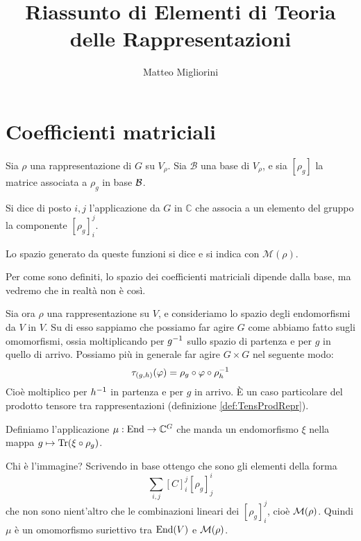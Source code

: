 \documentclass[a4paper,10pt,oneside]{math_article}
\title{Riassunto di Elementi di Teoria delle Rappresentazioni}
\author{Matteo Migliorini}
\date{}
\renewcommand{\phi}{\varphi}
\newcommand{\func}[2][\bC]{#1^{#2}}
\begin{document}
 
 
 \maketitle
 
 \cleardoublepage	
 
 \cleardoublepage
 \tableofcontents
 \cleardoublepage
 
 
 
 
 
 
 

  \section{Coefficienti matriciali}
    \begin{mydef}
     Sia $\rho$ una rappresentazione di $G$ su $V_\rho$. Sia $\mathcal B$ una base di $V_\rho$, e sia $[\rho_g]$ la matrice associata a $\rho_g$ in base $\mathcal B$.
     
     Si dice  di posto $i,j$ l'applicazione da $G$ in $\mathbb C$ che associa a un elemento del gruppo la componente $[\rho_g]_i^j$.
     
     Lo spazio generato da queste funzioni si dice  e si indica con $\mathcal M(\rho)$.
    \end{mydef}
    
    Per come sono definiti, lo spazio dei coefficienti matriciali dipende dalla base, ma vedremo che in realtà non è così.
    
    Sia ora $\rho$ una rappresentazione su $V$, e consideriamo lo spazio degli endomorfismi da $V$ in $V$. Su di esso sappiamo che possiamo far agire $G$ come abbiamo fatto sugli omomorfismi, ossia moltiplicando per $g^{-1}$ sullo spazio di partenza e per $g$ in quello di arrivo. Possiamo più in generale far agire $G\times G$ nel seguente modo:
    \[
     \tau_{(g,h)} (\phi) = \rho_g \circ \phi \circ \rho_h\inv
    \]
		Cioè moltiplico per $h^{-1}$ in partenza e per $g$ in arrivo. \`E un caso particolare del prodotto tensore tra rappresentazioni (definizione \ref{def:TensProdRepr}).
		
		Definiamo l'applicazione $\mu: \End \rar \func G$ che manda un endomorfismo $\xi$ nella mappa $g\mapsto \operatorname{Tr}(\xi\circ\rho_g)$.

		Chi è l'immagine? Scrivendo in base ottengo che sono gli elementi della forma
		\[
			\sum_{i,j} [C]_i^j[\rho_g]_j^i
		\]
		che non sono nient'altro che le combinazioni lineari dei $[\rho_g]_i^j$, cioè $\mathcal M(\rho)$. Quindi $\mu$ è un omomorfismo suriettivo tra $\operatorname{End}(V)$ e $\mathcal M(\rho)$.
		
\end{document}

